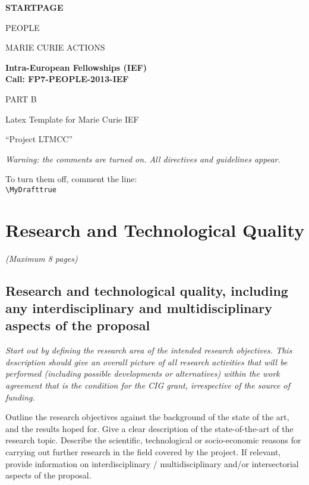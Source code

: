 \documentclass[a4paper,11pt]{article}
\title{\mytitle}
\newif\ifMyDraft%
\newcommand{\projectname}[0]{Project LTMCC\xspace}
\newcommand{\mytitle}{Latex Template for Marie Curie IEF}
\newenvironment{xcomment}{\em}{}
\newcommand{\cover}[1]{%
\newpage
\begin{center}
\vspace{4cm}
\textbf{#1}
\vspace{4cm}

PEOPLE

MARIE CURIE ACTIONS

\vspace{1cm}

\textbf{Intra-European Fellowships (IEF)}\\
\textbf{Call: FP7-PEOPLE-2013-IEF}

\vspace{4cm}

\Large{PART B}
\vspace{2cm}

\Huge{\mytitle}

\vspace{1cm}

\Large{``\projectname''}

\end{center}
\newpage
}
\begin{document}
\cover{STARTPAGE}

\newpage

\begin{xcomment} 
Warning: the comments are turned on. All directives and guidelines appear.

To turn them off, comment the line:\\ 
\verb|\MyDrafttrue|\\

\end{xcomment} 


\section{Research and Technological Quality}

\begin{xcomment}  
(Maximum 8 pages)  
\end{xcomment}

\subsection{Research and technological quality, including any interdisciplinary and multidisciplinary aspects of the proposal}

\begin{xcomment}  
Start out by defining the research area of the intended research
objectives. This description should give an overall picture of all
research activities that will be performed (including possible
developments or alternatives) within the work agreement that is the
condition for the CIG grant, irrespective of the source of funding.

Outline the research objectives against the background of the state of
the art, and the results hoped for. Give a clear description of the
state-of-the-art of the research topic. Describe the scientific,
technological or socio-economic reasons for carrying out further
research in the field covered by the project. If relevant, provide
information on interdisciplinary / multidisciplinary and/or
intersectorial aspects of the proposal.
\end{xcomment}
\end{document}
